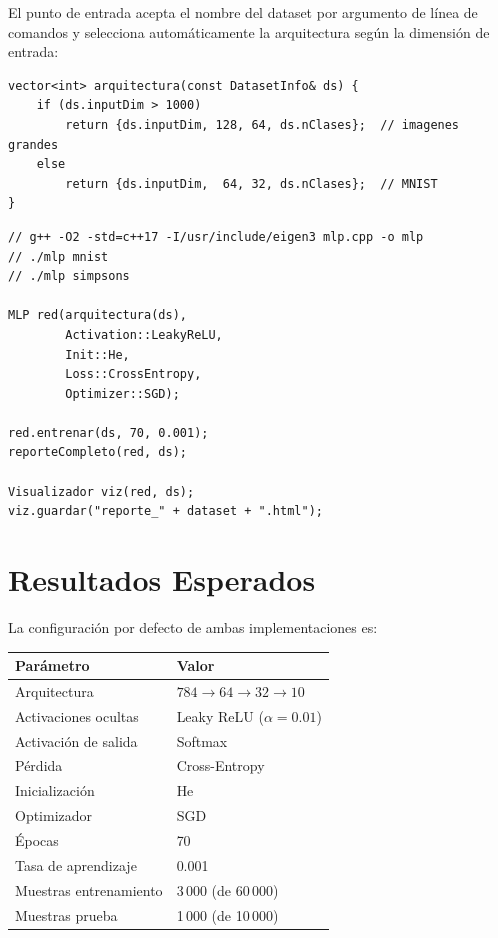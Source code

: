El punto de entrada acepta el nombre del dataset por argumento de línea de comandos y
selecciona automáticamente la arquitectura según la dimensión de entrada:

\begin{lstlisting}[style=cpp, caption={Selección automática de arquitectura}]
vector<int> arquitectura(const DatasetInfo& ds) {
    if (ds.inputDim > 1000)
        return {ds.inputDim, 128, 64, ds.nClases};  // imagenes grandes
    else
        return {ds.inputDim,  64, 32, ds.nClases};  // MNIST
}
\end{lstlisting}

\begin{lstlisting}[style=cpp, caption={Ejemplo de uso completo}]
// g++ -O2 -std=c++17 -I/usr/include/eigen3 mlp.cpp -o mlp
// ./mlp mnist
// ./mlp simpsons

MLP red(arquitectura(ds),
        Activation::LeakyReLU,
        Init::He,
        Loss::CrossEntropy,
        Optimizer::SGD);

red.entrenar(ds, 70, 0.001);
reporteCompleto(red, ds);

Visualizador viz(red, ds);
viz.guardar("reporte_" + dataset + ".html");
\end{lstlisting}

\section{Resultados Esperados}

La configuración por defecto de ambas implementaciones es:

\begin{center}
\begin{tabular}{ll}
\toprule
\textbf{Parámetro}    & \textbf{Valor} \\
\midrule
Arquitectura          & $784 \to 64 \to 32 \to 10$ \\
Activaciones ocultas  & Leaky ReLU ($\alpha=0.01$) \\
Activación de salida  & Softmax \\
Pérdida               & Cross-Entropy \\
Inicialización        & He \\
Optimizador           & SGD \\
Épocas                & 70 \\
Tasa de aprendizaje   & 0.001 \\
Muestras entrenamiento & 3\,000 (de 60\,000) \\
Muestras prueba        & 1\,000 (de 10\,000) \\
\bottomrule
\end{tabular}
\end{center}

